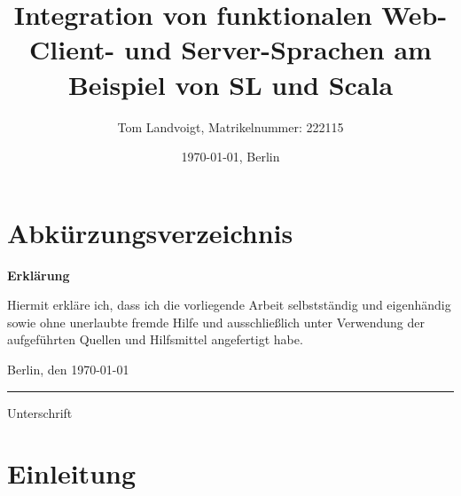 \documentclass[12pt,bibtotoc]{scrreprt}
\title{Integration von funktionalen Web-Client- und Server-Sprachen am Beispiel von SL und Scala}
\author{Tom Landvoigt, Matrikelnummer: 222115}
\date{\today{}, Berlin}
\begin{document}
\maketitle
\tableofcontents   %
\listoffigures     %
\listoftables      %
\lstlistoflistings %

\chapter*{Abkürzungsverzeichnis}
\begin{acronym}[TU-Berlin]
\setlength{\itemsep}{-0.3\parsep}
 \acro{}{}
\end{acronym}


\newpage
\thispagestyle{empty}		%
\begin{LARGE}
	\textbf{Erklärung}
\end{LARGE}

\vspace{1cm}

Hiermit erkläre ich, dass ich die vorliegende Arbeit selbstständig und eigenhändig sowie ohne unerlaubte fremde Hilfe und ausschließlich unter Verwendung der aufgeführten Quellen und Hilfsmittel angefertigt habe.
\vspace{2cm}

Berlin, den \today

\vspace{1cm}

\rule{0.3\textwidth}{0.4pt}

Unterschrift

\vspace*{6cm}
\newpage


\lstset{basicstyle=\ttfamily\small, numbers=left, numberstyle=\tiny}

\chapter{Einleitung}
\setcounter{page}{1}
\end{document}
